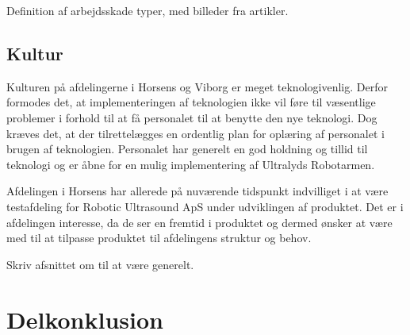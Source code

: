 Definition af arbejdsskade typer, med billeder fra artikler. 

\subsection{Kultur}
Kulturen på afdelingerne i Horsens og Viborg er meget teknologivenlig. Derfor formodes det, at implementeringen af teknologien ikke vil føre til væsentlige problemer i forhold til at få personalet til at benytte den nye teknologi. Dog kræves det, at der tilrettelægges en ordentlig plan for oplæring af personalet i brugen af teknologien. Personalet har generelt en god holdning og tillid til teknologi og er åbne for en mulig implementering af Ultralyds Robotarmen.

Afdelingen i Horsens har allerede på nuværende tidspunkt indvilliget i at være testafdeling for Robotic Ultrasound ApS under udviklingen af produktet. Det er i afdelingen interesse, da de ser en fremtid i produktet og dermed ønsker at være med til at tilpasse produktet til afdelingens struktur og behov.   

Skriv afsnittet om til at være generelt. 

\section{Delkonklusion}

